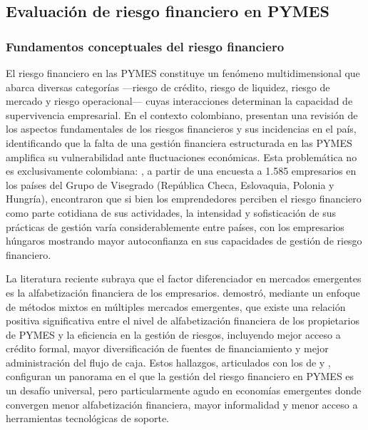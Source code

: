 \documentclass[12pt, letterpaper]{article}
\begin{document}
\subsection{Evaluaci\'on de riesgo financiero en PYMES}
\label{sec:riesgo}

\subsubsection{Fundamentos conceptuales del riesgo financiero}

El riesgo financiero en las PYMES constituye un fen\'omeno multidimensional que abarca diversas categor\'ias ---riesgo de cr\'edito, riesgo de liquidez, riesgo de mercado y riesgo operacional--- cuyas interacciones determinan la capacidad de supervivencia empresarial. En el contexto colombiano, \citet{HigueraVargas2021} presentan una revisi\'on de los aspectos fundamentales de los riesgos financieros y sus incidencias en el pa\'is, identificando que la falta de una gesti\'on financiera estructurada en las PYMES amplifica su vulnerabilidad ante fluctuaciones econ\'omicas. Esta problem\'atica no es exclusivamente colombiana: \citet{Kotaskova2020}, a partir de una encuesta a 1.585 empresarios en los pa\'ises del Grupo de Visegrado (Rep\'ublica Checa, Eslovaquia, Polonia y Hungr\'ia), encontraron que si bien los emprendedores perciben el riesgo financiero como parte cotidiana de sus actividades, la intensidad y sofisticaci\'on de sus pr\'acticas de gesti\'on var\'ia considerablemente entre pa\'ises, con los empresarios h\'ungaros mostrando mayor autoconfianza en sus capacidades de gesti\'on de riesgo financiero.

La literatura reciente subraya que el factor diferenciador en mercados emergentes es la alfabetizaci\'on financiera de los empresarios. \citet{Senaya2025} demostr\'o, mediante un enfoque de m\'etodos mixtos en m\'ultiples mercados emergentes, que existe una relaci\'on positiva significativa entre el nivel de alfabetizaci\'on financiera de los propietarios de PYMES y la eficiencia en la gesti\'on de riesgos, incluyendo mejor acceso a cr\'edito formal, mayor diversificaci\'on de fuentes de financiamiento y mejor administraci\'on del flujo de caja. Estos hallazgos, articulados con los de \citet{Kotaskova2020} y \citet{HigueraVargas2021}, configuran un panorama en el que la gesti\'on del riesgo financiero en PYMES es un desaf\'io universal, pero particularmente agudo en econom\'ias emergentes donde convergen menor alfabetizaci\'on financiera, mayor informalidad y menor acceso a herramientas tecnol\'ogicas de soporte.
\end{document}
